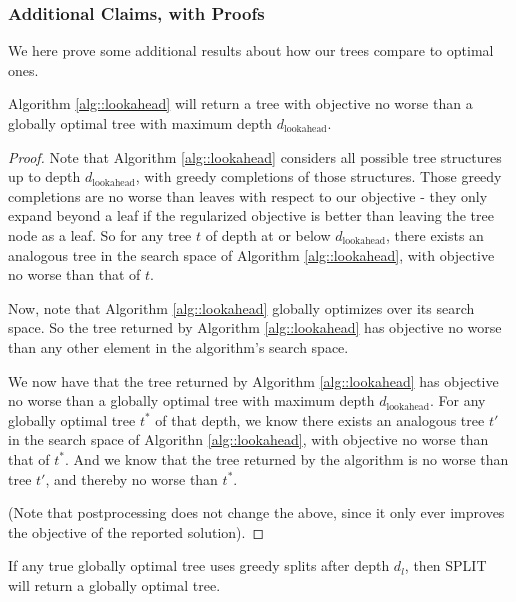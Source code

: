 \subsubsection{Additional Claims, with Proofs}
We here prove some additional results about how our trees compare to optimal ones. 

\begin{theorem}
Algorithm \ref{alg::lookahead} will return a tree with objective no worse than a globally optimal tree with maximum depth $d_\textrm{lookahead}$. 
\end{theorem}
\begin{proof}
    Note that Algorithm \ref{alg::lookahead} considers all possible tree structures up to depth $d_\textrm{lookahead}$, with greedy completions of those structures. Those greedy completions are no worse than leaves with respect to our objective - they only expand beyond a leaf if the regularized objective is better than leaving the tree node as a leaf. So for any tree $t$ of depth at or below $d_\textrm{lookahead}$, there exists an analogous tree in the search space of Algorithm \ref{alg::lookahead}, with objective no worse than that of $t$. 

    Now, note that Algorithm \ref{alg::lookahead} globally optimizes over its search space. So the tree returned by Algorithm \ref{alg::lookahead} has objective no worse than any other element in the algorithm's search space.

    We now have that the tree returned by Algorithm \ref{alg::lookahead} has objective no worse than a globally optimal tree with maximum depth $d_\textrm{lookahead}$. For any globally optimal tree $t^*$ of that depth, we know there exists an analogous tree $t'$ in the search space of Algorithn \ref{alg::lookahead}, with objective no worse than that of $t^*$. And we know that the tree returned by the algorithm is no worse than tree $t'$, and thereby no worse than $t^*$. 

    (Note that postprocessing does not change the above, since it only ever improves the objective of the reported solution).
\end{proof}

\begin{theorem}\label{thm:opt}
If any true globally optimal tree uses greedy splits after depth $d_l$, then SPLIT will return a globally optimal tree.
\end{theorem}

